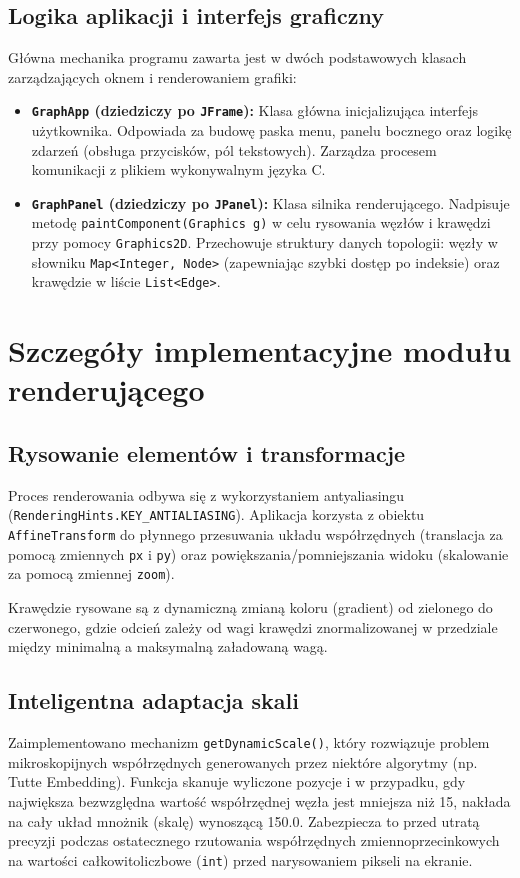\documentclass[12pt, a4paper]{article}
\begin{document}
\subsection{Logika aplikacji i interfejs graficzny}
Główna mechanika programu zawarta jest w dwóch podstawowych klasach zarządzających oknem i renderowaniem grafiki:
\begin{itemize}
    \item \textbf{\texttt{GraphApp} (dziedziczy po \texttt{JFrame}):} Klasa główna inicjalizująca interfejs użytkownika. Odpowiada za budowę paska menu, panelu bocznego oraz logikę zdarzeń (obsługa przycisków, pól tekstowych). Zarządza procesem komunikacji z plikiem wykonywalnym języka C.
    \item \textbf{\texttt{GraphPanel} (dziedziczy po \texttt{JPanel}):} Klasa silnika renderującego. Nadpisuje metodę \texttt{paintComponent(Graphics g)} w celu rysowania węzłów i krawędzi przy pomocy \texttt{Graphics2D}. Przechowuje struktury danych topologii: węzły w słowniku \texttt{Map<Integer, Node>} (zapewniając szybki dostęp po indeksie) oraz krawędzie w liście \texttt{List<Edge>}.
\end{itemize}

\section{Szczegóły implementacyjne modułu renderującego}

\subsection{Rysowanie elementów i transformacje}
Proces renderowania odbywa się z wykorzystaniem antyaliasingu (\texttt{RenderingHints.KEY\_ANTIALIASING}). 
Aplikacja korzysta z obiektu \texttt{AffineTransform} do płynnego przesuwania układu współrzędnych (translacja za pomocą zmiennych \texttt{px} i \texttt{py}) oraz powiększania/pomniejszania widoku (skalowanie za pomocą zmiennej \texttt{zoom}).

Krawędzie rysowane są z dynamiczną zmianą koloru (gradient) od zielonego do czerwonego, gdzie odcień zależy od wagi krawędzi znormalizowanej w przedziale między minimalną a maksymalną załadowaną wagą.

\subsection{Inteligentna adaptacja skali}
Zaimplementowano mechanizm \texttt{getDynamicScale()}, który rozwiązuje problem mikroskopijnych współrzędnych generowanych przez niektóre algorytmy (np. Tutte Embedding). Funkcja skanuje wyliczone pozycje i w przypadku, gdy największa bezwzględna wartość współrzędnej węzła jest mniejsza niż 15, nakłada na cały układ mnożnik (skalę) wynoszącą 150.0. Zabezpiecza to przed utratą precyzji podczas ostatecznego rzutowania współrzędnych zmiennoprzecinkowych na wartości całkowitoliczbowe (\texttt{int}) przed narysowaniem pikseli na ekranie.
\end{document}

